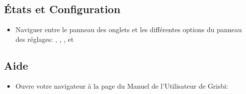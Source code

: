 \subsection{États et Configuration}
\begin{itemize}
	\item Naviguer entre le panneau des onglets et les différentes options du panneau des réglages: , , ,  et 
\end{itemize}

\subsection{Aide}

\begin{itemize}
	\item Ouvre votre navigateur à la page du Manuel de l'Utilisateur de Grisbi: 
\end{itemize}













